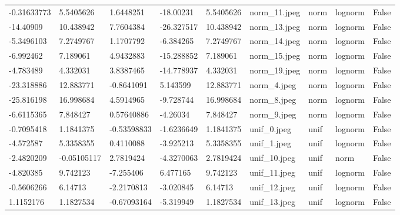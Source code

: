 \documentclass[12pt]{article}
\begin{document}
\begin{table}
{\begin{tabular}{l | l | l | l | l | l | l | l | l}
                        -0.31633773 & 5.5405626   & 1.6448251    & -18.00231  & 5.5405626 & norm\_11.jpeg      & norm    & lognorm & False      \\
                        -14.40909   & 10.438942   & 7.7604384    & -26.327517 & 10.438942 & norm\_13.jpeg      & norm    & lognorm & False      \\
                        -5.3496103  & 7.2749767   & 1.1707792    & -6.384265  & 7.2749767 & norm\_14.jpeg      & norm    & lognorm & False      \\
                        -6.992462   & 7.189061    & 4.9432883    & -15.288852 & 7.189061  & norm\_15.jpeg      & norm    & lognorm & False      \\
                        -4.783489   & 4.332031    & 3.8387465    & -14.778937 & 4.332031  & norm\_19.jpeg      & norm    & lognorm & False      \\
                        -23.318886  & 12.883771   & -0.8641091   & 5.143599   & 12.883771 & norm\_4.jpeg       & norm    & lognorm & False      \\
                        -25.816198  & 16.998684   & 4.5914965    & -9.728744  & 16.998684 & norm\_8.jpeg       & norm    & lognorm & False      \\
                        -6.6115365  & 7.848427    & 0.57640886   & -4.26034   & 7.848427  & norm\_9.jpeg       & norm    & lognorm & False      \\
                        -0.7095418  & 1.1841375   & -0.53598833  & -1.6236649 & 1.1841375 & unif\_0.jpeg       & unif    & lognorm & False      \\
                        -4.572587   & 5.3358355   & 0.4110088    & -3.925213  & 5.3358355 & unif\_1.jpeg       & unif    & lognorm & False      \\
                        -2.4820209  & -0.05105117 & 2.7819424    & -4.3270063 & 2.7819424 & unif\_10.jpeg      & unif    & norm    & False      \\
                        -4.820385   & 9.742123    & -7.255406    & 6.477165   & 9.742123  & unif\_11.jpeg      & unif    & lognorm & False      \\
                        -0.5606266  & 6.14713     & -2.2170813   & -3.020845  & 6.14713   & unif\_12.jpeg      & unif    & lognorm & False      \\
                        1.1152176   & 1.1827534   & -0.67093164  & -5.319949  & 1.1827534 & unif\_13.jpeg      & unif    & lognorm & False      \\

\end{tabular}}
\end{table}
\end{document}
